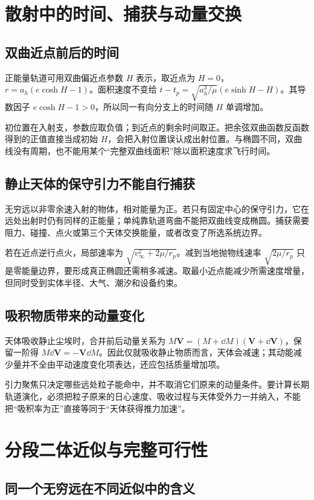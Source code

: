 \section{散射中的时间、捕获与动量交换}
\subsection{双曲近点前后的时间}

  正能量轨道可用双曲偏近点参数 $H$ 表示，取近点为 $H=0$，$r=a_h(e\cosh H-1)$。面积速度不变给 $t-t_p=\sqrt{a_h^3/\mu}(e\sinh H-H)$。其导数因子 $e\cosh H-1>0$，所以同一有向分支上的时间随 $H$ 单调增加。

  初位置在入射支，参数应取负值；到近点的剩余时间取正。把余弦双曲函数反函数得到的正值直接当成初始 $H$，会把入射位置误认成出射位置。与椭圆不同，双曲线没有周期，也不能用某个“完整双曲线面积”除以面积速度求飞行时间。
  
\subsection{静止天体的保守引力不能自行捕获}

  无穷远以非零余速入射的物体，相对能量为正。若只有固定中心的保守引力，它在远处出射时仍有同样的正能量；单纯靠轨道弯曲不能把双曲线变成椭圆。捕获需要阻力、碰撞、点火或第三个天体交换能量，或者改变了所选系统边界。

  若在近点逆行点火，局部速率为 $\sqrt{v_\infty^2+2\mu/r_p}$。减到当地抛物线速率 $\sqrt{2\mu/r_p}$ 只是零能量边界，要形成真正椭圆还需稍多减速。取最小近点能减少所需速度增量，但同时受到实体半径、大气、潮汐和设备约束。
  
\subsection{吸积物质带来的动量变化}

  天体吸收静止尘埃时，合并前后动量关系为 $M\bm V=(M+\dd M)(\bm V+\dd\bm V)$，保留一阶得 $M\dd\bm V=-\bm V\dd M$。因此仅就吸收静止物质而言，天体会减速；其动能减少量并不全由平动速度变化项表达，还应包括质量增加项。

  引力聚焦只决定哪些远处粒子能命中，并不取消它们原来的动量条件。要计算长期轨道演化，必须把粒子原来的日心速度、吸收过程与天体受外力一并纳入，不能把“吸积率为正”直接等同于“天体获得推力加速”。
  

\section{分段二体近似与完整可行性}
\subsection{同一个无穷远在不同近似中的含义}

